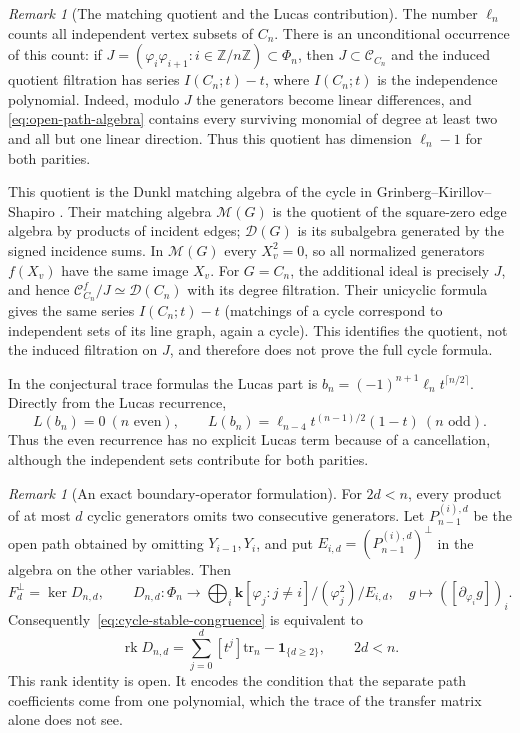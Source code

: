 \documentclass[reqno]{article}
\theoremstyle{plain} %
\theoremstyle{definition}
\theoremstyle{remark}
\newtheorem{remark}[theorem]{\sc Remark}
\DeclareMathOperator{\rank}{rk}
\newcommand{\Z}{{\mathbb{Z}}}
\newcommand{\K} {\mathbf{k}}
\newcommand {\CC}{\mathscr{C}}
\numberwithin{equation}{section}
\begin{document}
\begin{remark}[The matching quotient and the Lucas contribution]\label{rem:cycle-matching-quotient}
The number $\ell_n$ counts all independent vertex subsets of $C_n$.
There is an unconditional occurrence of this count: if
$J=(\varphi_i\varphi_{i+1}:i\in\Z/n\Z)\subset\Phi_n$, then
$J\subset\CC_{C_n}$ and the induced quotient filtration has series
$I(C_n;t)-t$, where $I(C_n;t)$ is the independence polynomial.
Indeed, modulo $J$ the generators become linear differences, and
\eqref{eq:open-path-algebra} contains every surviving monomial of degree
at least two and all but one linear direction. Thus this quotient has
dimension $\ell_n-1$ for both parities.

This quotient is the Dunkl matching algebra of the cycle in
Grinberg--Kirillov--Shapiro \cite{GKS}. Their matching algebra
$\mathcal M(G)$ is the quotient of the square-zero edge algebra by
products of incident edges; $\mathcal D(G)$ is its subalgebra generated
by the signed incidence sums. In $\mathcal M(G)$ every $X_v^2=0$, so
all normalized generators $f(X_v)$ have the same image $X_v$.
For $G=C_n$, the additional ideal is precisely $J$, and hence
$\CC_{C_n}^f/J\simeq\mathcal D(C_n)$ with its degree filtration.
Their unicyclic formula \cite[Theorem~5.16]{GKS} gives the same series
$I(C_n;t)-t$ (matchings of a cycle correspond to independent sets of
its line graph, again a cycle). This identifies the quotient, not the
induced filtration on $J$, and therefore does not prove the full
cycle formula.

In the conjectural trace formulas the Lucas part is
$b_n=(-1)^{n+1}\ell_nt^{\lceil n/2\rceil}$. Directly from the Lucas
recurrence,
\[
L(b_n)=0\ (n\text{ even}),\qquad
L(b_n)=\ell_{n-4}t^{(n-1)/2}(1-t)\ (n\text{ odd}).
\]
Thus the even recurrence has no explicit Lucas term because of a
cancellation, although the independent sets contribute for both
parities.
\end{remark}

\begin{remark}[An exact boundary-operator formulation]\label{rem:cycle-boundary-operator}
For $2d<n$, every product of at most $d$ cyclic generators omits two
consecutive generators. Let $P_{n-1}^{(i),d}$ be the open path obtained
by omitting $Y_{i-1},Y_i$, and put
$E_{i,d}=(P_{n-1}^{(i),d})^\perp$ in the algebra on the other variables.
Then
\[
F_d^\perp=\ker D_{n,d},\qquad
D_{n,d}:\Phi_n\longrightarrow
\bigoplus_i\K[\varphi_j:j\ne i]/(\varphi_j^2)\big/E_{i,d},
\quad g\longmapsto([\partial_{\varphi_i}g])_i.
\]
Consequently~\eqref{eq:cycle-stable-congruence} is equivalent to
\[
\rank D_{n,d}=\sum_{j=0}^d[t^j]\mathrm{tr}_n-\mathbf1_{\{d\ge2\}},
\qquad 2d<n.
\]
This rank identity is open. It encodes the condition that the
separate path coefficients come from one polynomial, which the trace of
the transfer matrix alone does not see.
\end{remark}
\end{document}
